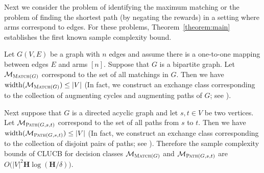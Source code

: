\documentclass{article}
\newcommand{\Algorithm}{{\small \textsf{CLUCB}}\xspace}
\newcommand{\M}{\mathcal M}
\DeclareMathOperator{\rank}{width}
\newcommand{\Match}{\textsc{Match}\xspace}
\newcommand{\Path}{\textsc{Path}\xspace}
\begin{document}
Next we consider the problem of identifying the maximum matching or the problem of finding the shortest path (by negating the rewards) in a setting where arms correspond to edges.
For these problems, Theorem~\ref{theorem:main} establishes the first known sample complexity bound.
\begin{example}
Let $G(V,E)$ be a graph with $n$ edges and assume there is a one-to-one mapping between edges $E$ and arms $[n]$.
Suppose that $G$ is a bipartite graph. 
Let $\M_{\Match(G)}$ correspond to the set of all matchings in $G$.
Then we have $\rank(\M_{\Match(G)}) \le |V|$ (In fact, we construct an exchange class corresponding to the collection of augmenting cycles and augmenting paths of $G$; see ).

Next suppose that $G$ is a directed acyclic graph and let $s,t\in V$ be two vertices.
Let $\M_{\Path(G,s,t)}$ correspond to the set of all paths from $s$ to $t$.
Then we have $\rank(\M_{\Path(G,s,t)}) \le |V|$ (In fact, we construct an exchange class corresponding to the collection of disjoint pairs of paths; see ).
Therefore the sample complexity bounds of \Algorithm for decision classes $\M_{\Match(G)}$ and $\M_{\Path(G,s,t)}$ are $O\big(|V|^2 \mathbf H \log (\mathbf H/\delta)\big)$.
\end{example}
\end{document}
